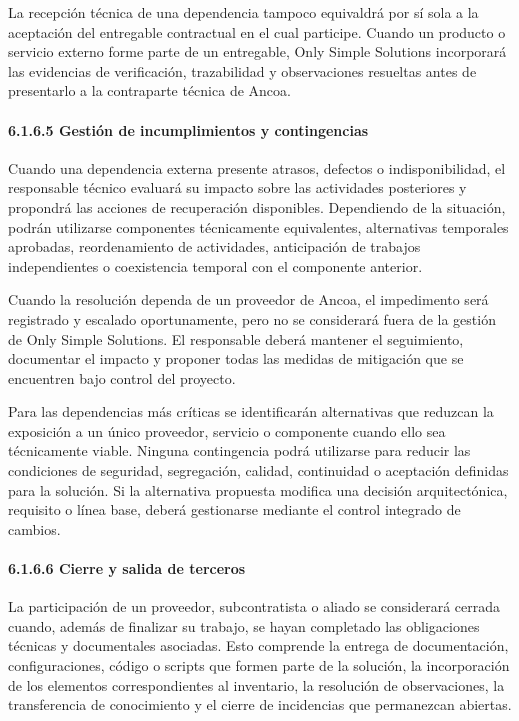 \documentclass[11pt]{article}
\begin{document}
La recepción técnica de una dependencia tampoco equivaldrá por sí sola a
la aceptación del entregable contractual en el cual participe. Cuando un
producto o servicio externo forme parte de un entregable, Only Simple
Solutions incorporará las evidencias de verificación, trazabilidad y
observaciones resueltas antes de presentarlo a la contraparte técnica de
Ancoa.

\paragraph{6.1.6.5 Gestión de incumplimientos y contingencias}\label{6-1-6-5-gestion-de-incumplimientos-y-contingencias}

Cuando una dependencia externa presente atrasos, defectos o indisponibilidad, el responsable técnico evaluará su impacto sobre las actividades posteriores y propondrá las acciones de recuperación disponibles. Dependiendo de la situación, podrán utilizarse componentes técnicamente equivalentes, alternativas temporales aprobadas, reordenamiento de actividades, anticipación de trabajos independientes o coexistencia temporal con el componente anterior.

Cuando la resolución dependa de un proveedor de Ancoa, el impedimento
será registrado y escalado oportunamente, pero no se considerará fuera
de la gestión de Only Simple Solutions. El responsable deberá mantener
el seguimiento, documentar el impacto y proponer todas las medidas de
mitigación que se encuentren bajo control del proyecto.

Para las dependencias más críticas se identificarán alternativas que
reduzcan la exposición a un único proveedor, servicio o componente
cuando ello sea técnicamente viable. Ninguna contingencia podrá
utilizarse para reducir las condiciones de seguridad, segregación,
calidad, continuidad o aceptación definidas para la solución. Si la
alternativa propuesta modifica una decisión arquitectónica, requisito o
línea base, deberá gestionarse mediante el control integrado de cambios.

\paragraph{6.1.6.6 Cierre y salida de terceros}\label{6-1-6-6-cierre-y-salida-de-terceros}

La participación de un proveedor, subcontratista o aliado se considerará cerrada cuando, además de finalizar su trabajo, se hayan completado las obligaciones técnicas y documentales asociadas. Esto comprende la entrega de documentación, configuraciones, código o scripts que formen parte de la solución, la incorporación de los elementos correspondientes al inventario, la resolución de observaciones, la transferencia de conocimiento y el cierre de incidencias que permanezcan abiertas.
\end{document}
